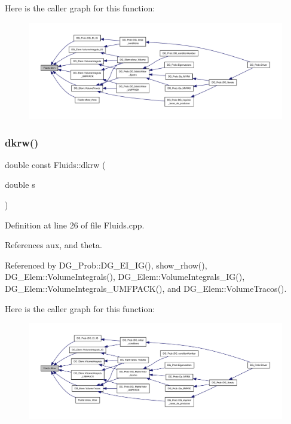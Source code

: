 Here is the caller graph for this function\+:
\nopagebreak
\begin{figure}[H]
\begin{center}
\leavevmode
\includegraphics[width=350pt]{classFluids_a66c100be378f015b8bbe47a0e0c176c1_icgraph}
\end{center}
\end{figure}
\mbox{\label{classFluids_abd769e3a9081140ed4fc7d877c6672d4}} 
\subsubsection{\texorpdfstring{dkrw()}{dkrw()}}
{\footnotesize\ttfamily double const Fluids\+::dkrw (\begin{DoxyParamCaption}\item[{double}]{s }\end{DoxyParamCaption})}



Definition at line 26 of file Fluids.\+cpp.



References aux, and theta.



Referenced by D\+G\+\_\+\+Prob\+::\+D\+G\+\_\+\+E\+I\+\_\+\+I\+G(), show\+\_\+rhow(), D\+G\+\_\+\+Elem\+::\+Volume\+Integrals(), D\+G\+\_\+\+Elem\+::\+Volume\+Integrals\+\_\+\+I\+G(), D\+G\+\_\+\+Elem\+::\+Volume\+Integrals\+\_\+\+U\+M\+F\+P\+A\+C\+K(), and D\+G\+\_\+\+Elem\+::\+Volume\+Tracos().

Here is the caller graph for this function\+:
\nopagebreak
\begin{figure}[H]
\begin{center}
\leavevmode
\includegraphics[width=350pt]{classFluids_abd769e3a9081140ed4fc7d877c6672d4_icgraph}
\end{center}
\end{figure}
\mbox{\label{classFluids_aa332e363bb05e9c5559386000241d66f}} 
